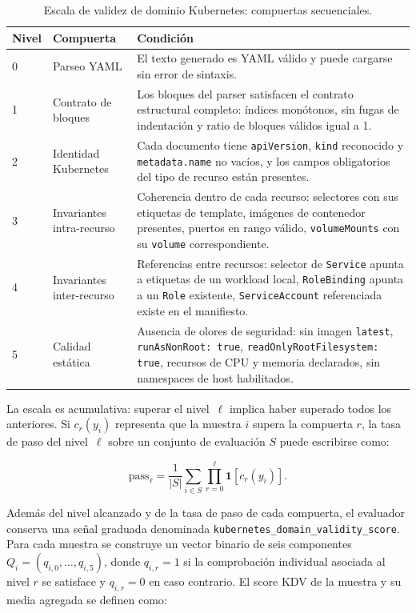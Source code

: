 \begin{table}[htbp]
\centering
\caption{Escala de validez de dominio Kubernetes: compuertas secuenciales.}
\label{tab:ch4_domain_levels}
\begin{tabular}{p{}p{}p{}}
\toprule
\textbf{Nivel} & \textbf{Compuerta} & \textbf{Condición} \\
\midrule
0 & Parseo YAML & El texto generado es YAML válido y puede cargarse sin error de sintaxis. \\
1 & Contrato de bloques & Los bloques del parser satisfacen el contrato estructural completo: índices monótonos, sin fugas de indentación y ratio de bloques válidos igual a 1. \\
2 & Identidad Kubernetes & Cada documento tiene \texttt{apiVersion}, \texttt{kind} reconocido y \texttt{metadata.name} no vacíos, y los campos obligatorios del tipo de recurso están presentes. \\
3 & Invariantes intra-recurso & Coherencia dentro de cada recurso: selectores con sus etiquetas de template, imágenes de contenedor presentes, puertos en rango válido, \texttt{volumeMounts} con su \texttt{volume} correspondiente. \\
4 & Invariantes inter-recurso & Referencias entre recursos: selector de \texttt{Service} apunta a etiquetas de un workload local, \texttt{RoleBinding} apunta a un \texttt{Role} existente, \texttt{ServiceAccount} referenciada existe en el manifiesto. \\
5 & Calidad estática & Ausencia de olores de seguridad: sin imagen \texttt{latest}, \texttt{runAsNonRoot: true}, \texttt{readOnlyRootFilesystem: true}, recursos de CPU y memoria declarados, sin namespaces de host habilitados. \\
\bottomrule
\end{tabular}
\end{table}

La escala es acumulativa: superar el nivel~$\ell$ implica haber superado todos los anteriores. Si \(c_r(y_i)\) representa que la muestra \(i\) supera la compuerta \(r\),
la tasa de paso del nivel~\(\ell\) sobre un conjunto de evaluación \(S\) puede escribirse como:

\[
\mathrm{pass}_{\ell} =
\frac{1}{|S|}\sum_{i \in S}\prod_{r=0}^{\ell}\mathbf{1}[c_r(y_i)].
\]

Además del nivel alcanzado y de la tasa de paso de cada compuerta, el evaluador conserva una señal graduada denominada \texttt{kubernetes\_domain\_validity\_score}. Para cada
muestra se construye un vector binario de seis componentes \(Q_i = (q_{i,0}, \ldots, q_{i,5})\), donde \(q_{i,r}=1\) si la comprobación individual asociada al nivel \(r\) se satisface
y \(q_{i,r}=0\) en caso contrario. El score KDV de la muestra y su media agregada se definen como:

